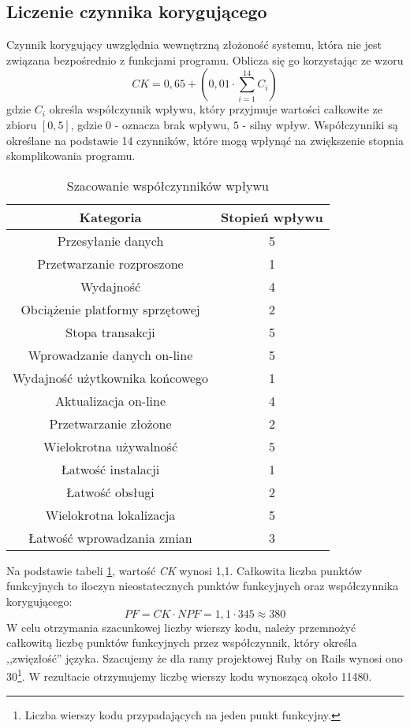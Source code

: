 \documentclass[12pt,leqno,twoside]{mwart}
\begin{document}
\subsection{Liczenie czynnika korygującego}
\noindent Czynnik korygujący uwzględnia wewnętrzną złożoność systemu, która nie jest związana bezpośrednio z funkcjami programu. Oblicza się go korzystając ze wzoru
\begin{displaymath}
CK = 0,65 + (0,01 \cdot \sum_{i=1}^{14} C_i)
\end{displaymath}
gdzie $C_i$ określa współczynnik wpływu, który przyjmuje wartości całkowite ze zbioru $[0,5]$, gdzie $0$ - oznacza brak wpływu, $5$ - silny wpływ. Współczynniki są określane na podstawie 14 czynników, które mogą wpłynąć na zwiększenie stopnia skomplikowania programu.
\begin{table}[h]
	\centering
	\caption{Szacowanie współczynników wpływu}
		\rule{0pt}{3ex}
		\begin{tabular}{|c|c|}
		\hline
		\textbf{Kategoria}				& \textbf{Stopień wpływu} \\ \hline
		Przesyłanie danych 				& 5\\ \hline
		Przetwarzanie rozproszone 		& 1\\ \hline
		Wydajność 						& 4\\ \hline
		Obciążenie platformy sprzętowej & 2\\ \hline
		Stopa transakcji 				& 5\\ \hline
		Wprowadzanie danych on-line 	& 5\\ \hline
		Wydajność użytkownika końcowego & 1\\ \hline
		Aktualizacja on-line 			& 4\\ \hline
		Przetwarzanie złożone 			& 2\\ \hline
		Wielokrotna używalność 			& 5\\ \hline
		Łatwość instalacji 				& 1\\ \hline
		Łatwość obsługi					& 2\\ \hline
		Wielokrotna lokalizacja 		& 5\\ \hline
		Łatwość wprowadzania zmian 		& 3\\ \hline
		\end{tabular}
	\label{wsp_wplywu}
\end{table}

Na podstawie tabeli \ref{wsp_wplywu}, wartość \textit{CK} wynosi 1,1. Całkowita liczba punktów funkcyjnych to iloczyn nieostatecznych punktów funkcyjnych oraz współczynnika korygującego:
\begin{displaymath}
PF = CK \cdot NPF = 1,1 \cdot 345 \approx 380
\end{displaymath}
W celu otrzymania szacunkowej liczby wierszy kodu, należy przemnożyć całkowitą liczbę punktów funkcyjnych przez współczynnik, który określa ,,zwięzłość'' języka. Szacujemy że dla ramy projektowej Ruby on Rails wynosi ono 30\footnote{Liczba wierszy kodu przypadających na jeden punkt funkcyjny.}. W rezultacie otrzymujemy liczbę wierszy kodu wynoszącą około 11480.
\end{document}
